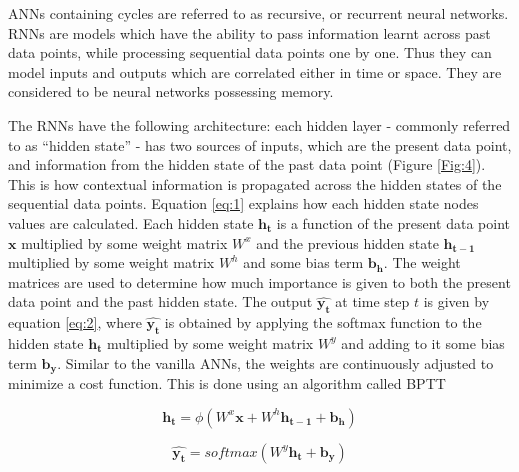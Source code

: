 
\ac{ANNs} containing cycles are referred to as recursive, or recurrent neural networks. \ac{RNNs} are models which have the ability to pass information learnt across past data points, while processing sequential data points one by one. Thus they can model inputs and outputs which are correlated either in time or space. They are considered to be neural networks possessing memory.


The \ac{RNNs} have the following architecture: each hidden layer - commonly referred to as \enquote{hidden state} - has two sources of inputs, which are the present data point, and information from the hidden state of the past data point (Figure \ref{Fig:4}). This is how contextual information is propagated across the hidden states of the sequential data points. 
Equation \ref{eq:1} explains how each hidden state nodes values are calculated. Each hidden state $ \mathbf{h_t} $ is a function of the present data point $ \mathbf{x} $ multiplied by some weight matrix $ W^x $ and the previous hidden state $ \mathbf{h_{t-1}} $ multiplied by some weight matrix $ W^h $ and some bias term $ \mathbf{b_h} $. The weight matrices are used to determine how much importance is given to both the present data point and the past hidden state. The output $ \mathbf{\widehat{y_t}} $ at time step $ t $ is given by equation \ref{eq:2}, where $ \mathbf{\widehat{y_t}} $ is obtained by applying the softmax function to the hidden state $  \mathbf{h_t} $ multiplied by some weight matrix $ W^y $ and adding to it some bias term $ \mathbf{b_y} $. Similar to the vanilla \ac{ANNs}, the weights are continuously adjusted to minimize a cost function. This is done using an algorithm called \ac{BPTT} \cite{werbos1990backpropagation}


\begin{equation}
\label{eq:1}
\mathbf{h_t} = \phi(W^x \mathbf{x} + W^h \mathbf{h_{t-1}} + \mathbf{b_h})
\end{equation}

\begin{equation}
\label{eq:2}
\mathbf{\widehat{y_t}} = softmax(W^y \mathbf{h_t} + \mathbf{b_y})
\end{equation}


